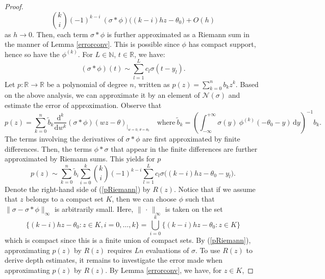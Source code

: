 \documentclass[anon,12pt]{colt2021} %
\begin{document}
\begin{proof}
\begin{equation*}
    \binom{k}{i}
    (-1)^{k-i} \ (\sigma * \phi) \big((k-i)hz - \theta_{0} \big) + O(h)
\end{equation*}
as $h \rightarrow 0$. Then, each term $\sigma * \phi $ is further approximated as a Riemann sum in the manner of Lemma \ref{errorconv}. This is possible since $\phi$ has compact support, hence so have the $\phi ^{(k)}$. For $L \in \mathbb{N}$, $t \in \mathbb{R}$, we have:
\begin{equation} \label{RiemannSum}
   (\sigma * \phi) (t) \sim \sum_{l=1}^{L} c_{l} \sigma(t- y_{l}).
\end{equation}
Let $p: \mathbb{R} \rightarrow \mathbb{R}$ be a polynomial of degree $n$, written as $p(z) = \sum_{k=0}^{n} b_{k}z^{k}$. Based on the above analysis, we can approximate it by an element of $\mathcal{N}(\sigma)$ and estimate the error of approximation. Observe that
\begin{equation} \label{pwithsigma}
    p(z) = \sum_{k=0}^{n} \tilde b_{k} \frac{\mathrm{d}^{k}}{\mathrm{d}w^{k}} (\sigma * \phi)(wz - \theta)_{\big|_{ \scriptstyle w=0, \ \theta = \theta_{0}}}  \quad \text{where} \ \tilde b_{k} =  \left( \int_{ - \infty}^{+ \infty} \sigma(y) \ \phi ^{(k)}(- \theta_{0} - y) \, \mathrm{d}y \right)^{-1} b_{k}.
\end{equation}
The terms involving the derivatives of $\sigma * \phi$ are first approximated by finite differences. Then, the terms $\phi * \sigma$ that appear in the finite differences are further approximated by Riemann sums. This yields for $p$
\begin{equation} \label{pRiemann}
    p(z) \sim \sum_{k=0}^{n} \tilde b_{i} \sum_{i=0}^{k} 
    \binom{k}{i}
    (-1)^{k-i} \sum_{l=1}^{L} c_{l} \sigma \big( (k-i)hz - \theta_{0} - y_{l} \big).
\end{equation}
Denote the right-hand side of (\ref{pRiemann}) by $R(z)$. Notice that if we assume that $z$ belongs to a compact set $K$, then we can choose $\phi$ such that $\| \sigma - \sigma * \phi \|_{\infty} $ is arbitrarily small. Here, $\| \, \cdot \, \|_{\infty}$ is taken on the set
\begin{equation*}
    \lbrace (k-i)hz - \theta_{0}: z \in K, i=0,\dots, k \rbrace = \bigcup_{i=0}^{k} \big \lbrace (k-i)hz - \theta_{0}: z \in K \big \rbrace
\end{equation*}
which is compact since this is a finite union of compact sets. By (\ref{pRiemann}), approximating $p(z)$ by $R(z)$ requires $Ln$ evaluations of $\sigma$. To use $R(z)$ to derive depth estimates, it remains to investigate the error made when approximating $p(z)$ by $R(z)$.  By Lemma \ref{errorconv}, we have, for $z \in K$, 

\end{proof}
\end{document}
